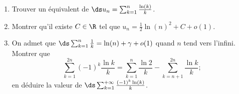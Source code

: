 \begin{enonce}
\begin{exercise}[ID={RMS123 E593, Mines PSI},subtitle={},tags={}, difficulty={0}]
\begin{enumerate}
  \item Trouver un équivalent de $\ds u_n=\sum_{k=1}^n \frac{\ln(k)}{k}$.
  \item Montrer qu'il existe $C\in\R$ tel que $u_n=\frac12 \ln(n)^2 + C +o(1)$.
  \item On admet que $\ds\sum_{k=1}^n \frac1k=\ln(n)+\gamma + o(1)$ quand $n$ tend vers l'infini. Montrer que
    \begin{equation*}
      \sum_{k=1}^{2n} (-1)^k\frac{\ln k}{k}
      = \sum_{k=1}^n\frac{\ln 2}{k} - \sum_{k=n+1}^{2n} \frac{\ln k}{k} ;
    \end{equation*}
    en déduire la valeur de $\ds\sum_{k=1}^{+\infty} \frac{(-1)^k\ln(k)}{k}$.
\end{enumerate}
\end{exercise}
\begin{solution}
\end{solution}
\end{enonce}
